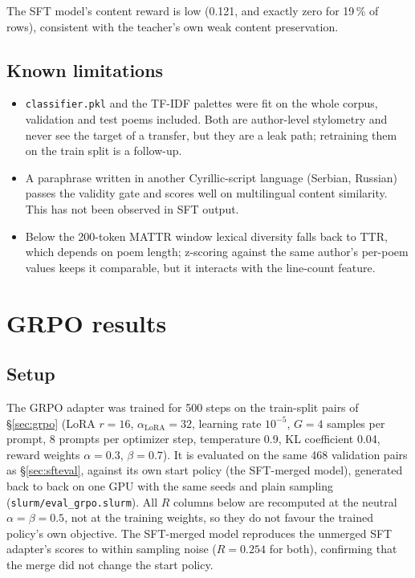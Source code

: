 \documentclass[11pt]{article}
\begin{document}
The SFT model's content reward is low (0.121, and exactly zero for 19\,\% of
rows), consistent with the teacher's own weak content preservation.


\subsection{Known limitations}

\begin{itemize}
  \item \texttt{classifier.pkl} and the TF-IDF palettes were fit on the whole
    corpus, validation and test poems included. Both are author-level
    stylometry and never see the target of a transfer, but they are a leak
    path; retraining them on the train split is a follow-up.
  \item A paraphrase written in another Cyrillic-script language (Serbian,
    Russian) passes the validity gate and scores well on multilingual
    content similarity. This has not been observed in SFT output.
  \item Below the 200-token MATTR window lexical diversity falls back to TTR,
    which depends on poem length; z-scoring against the same author's
    per-poem values keeps it comparable, but it interacts with the line-count
    feature.
\end{itemize}

\section{GRPO results}\label{sec:grporesults}

\subsection{Setup}

The GRPO adapter was trained for 500 steps on the train-split pairs of
\S\ref{sec:grpo} (LoRA $r=16$, $\alpha_{\mathrm{LoRA}}=32$, learning rate
$10^{-5}$, $G=4$ samples per prompt, 8 prompts per optimizer step, temperature
0.9, KL coefficient 0.04, reward weights $\alpha=0.3$, $\beta=0.7$). It is
evaluated on the same 468 validation pairs as \S\ref{sec:sfteval}, against
its own start policy (the SFT-merged model), generated back to back on one
GPU with the same seeds and plain sampling (\texttt{slurm/eval\_grpo.slurm}).
All $R$ columns below are recomputed at the neutral $\alpha=\beta=0.5$, not
at the training weights, so they do not favour the trained policy's own
objective. The SFT-merged model reproduces the unmerged SFT adapter's scores to
within sampling noise ($R=0.254$ for both), confirming that the merge did not
change the start policy.
\end{document}
